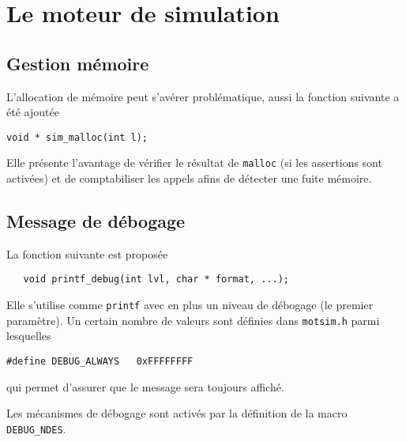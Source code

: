%
\section{Le moteur de simulation}
\label{section:motsim}

%
\subsection{Gestion mémoire}

   L'allocation de mémoire peut s'avérer problématique, aussi la
fonction suivante a été ajoutée

\begin{verbatim}
void * sim_malloc(int l);
\end{verbatim}

   Elle présente l'avantage de vérifier le résultat de {\tt malloc}
(si les assertions sont activées) et de comptabiliser les appels afins
de détecter une fuite mémoire.

%
\subsection{Message de débogage}

   La fonction suivante est proposée 

\begin{verbatim}
   void printf_debug(int lvl, char * format, ...);
\end{verbatim}

   Elle s'utilise comme {\tt printf} avec en plus un niveau de
débogage (le premier paramètre). Un certain nombre de valeurs sont
définies dans {\tt motsim.h} parmi lesquelles

\begin{verbatim}
#define DEBUG_ALWAYS   0xFFFFFFFF
\end{verbatim}

   qui permet d'assurer que le message sera toujours affiché.

   Les mécanismes de débogage sont activés par la définition de la
macro {\tt DEBUG\_NDES}.

